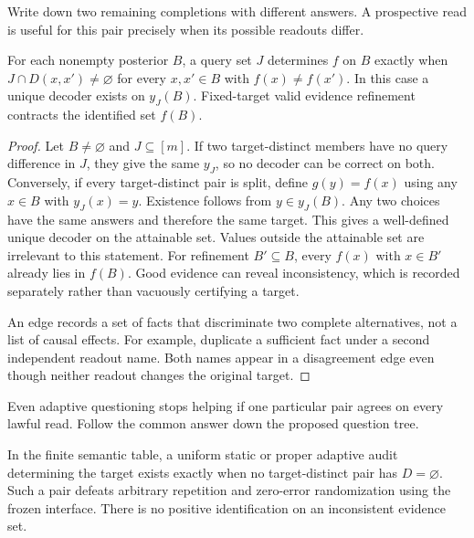 Write down two remaining completions with different answers. A prospective read is useful for this pair precisely when its possible readouts differ.

\begin{theorem}\label{thm:t04}

For each nonempty posterior \(B\), a query set \(J\) determines \(f\) on \(B\) exactly when \(J\cap D(x,x')\ne\varnothing\) for every \(x,x'\in B\) with \(f(x)\ne f(x')\). In this case a unique decoder exists on \(y_J(B)\). Fixed-target valid evidence refinement contracts the identified set \(f(B)\).

\end{theorem}

\begin{proof}

Let \(B\ne\varnothing\) and \(J\subseteq[m]\). If two target-distinct members have no query difference in \(J\), they give the same \(y_J\), so no decoder can be correct on both. Conversely, if every target-distinct pair is split, define \(g(y)=f(x)\) using any \(x\in B\) with \(y_J(x)=y\). Existence follows from \(y\in y_J(B)\). Any two choices have the same answers and therefore the same target. This gives a well-defined unique decoder on the attainable set. Values outside the attainable set are irrelevant to this statement. For refinement \(B'\subseteq B\), every \(f(x)\) with \(x\in B'\) already lies in \(f(B)\). Good evidence can reveal inconsistency, which is recorded separately rather than vacuously certifying a target.

An edge records a set of facts that discriminate two complete alternatives, not a list of causal effects. For example, duplicate a sufficient fact under a second independent readout name. Both names appear in a disagreement edge even though neither readout changes the original target.

\end{proof}

Even adaptive questioning stops helping if one particular pair agrees on every lawful read. Follow the common answer down the proposed question tree.

\begin{theorem}\label{thm:t05}

In the finite semantic table, a uniform static or proper adaptive audit determining the target exists exactly when no target-distinct pair has \(D=\varnothing\). Such a pair defeats arbitrary repetition and zero-error randomization using the frozen interface. There is no positive identification on an inconsistent evidence set.

\end{theorem}

